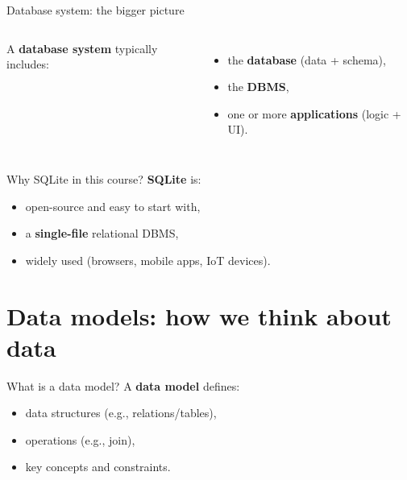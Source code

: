 \documentclass[10pt,aspectratio=169]{beamer}
\begin{document}
\begin{frame}{Database system: the bigger picture}
\begin{columns}[T,onlytextwidth]
  A \textbf{database system} typically includes:
  \begin{itemize}
    \item the \textbf{database} (data + schema),
    \item the \textbf{DBMS},
    \item one or more \textbf{applications} (logic + UI).
  \end{itemize}

  \centering
\end{columns}
\end{frame}

\begin{frame}{Why SQLite in this course?}
\textbf{SQLite} is:
\begin{itemize}
  \item open-source and easy to start with,
  \item a \textbf{single-file} relational DBMS,
  \item widely used (browsers, mobile apps, IoT devices).
\end{itemize}
\end{frame}

\section{Data models: how we think about data}

\begin{frame}{What is a data model?}
A \textbf{data model} defines:
\begin{itemize}
  \item data structures (e.g., relations/tables),
  \item operations (e.g., join),
  \item key concepts and constraints.
\end{itemize}
\end{frame}
\end{document}
